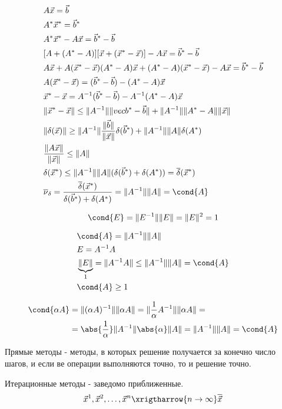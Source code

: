 \begin{align*}
  &A\vec{x} = \vec{b} \\
  &A^*\vec{x}^* = \vec{b}^*\\
  &A^*\vec{x}^* - A\vec{x} = \vec{b}^* - \vec{b} \\
  &[A + (A^* - A)][\vec{x} + (\vec{x}^* - \vec{x})] - A\vec{x} =\vec{b}^* - \vec{b} \\
  &A \vec{x} + A (\vec{x}^* - \vec{x}) (A^* - A)\vec{x} + (A^* - A)(\vec{x}^* - \vec{x}) - A\vec{x} = \vec{b}^* - \vec{b} \\
  &A(\vec{x}^* - \vec{x}) = (\vec{b}^* - \vec{b}) - (A^* - A)\vec{x} \\
  &\vec{x}^* - \vec{x} = A^{-1}(\vec{b}^* - \vec{b}) - A^{-1}(A^* - A)\vec{x} \\
  &\|\vec{x}^* - \vec{x}\| \leq \|A^{-1}\| \|vec{b}^* - \vec{b}\| + \|A^{-1}\| \|A^* - A\|\|\vec{x}\| \\
  &\|\delta(\vec{x})\| \geq \|A^{-1}\| \frac{\|\vec{b}\|}{\|\vec{x}\|} \delta(\vec{b}^*) +\|A^{-1}\| \|A\| \delta(A^*) \\
  &\frac{\|A\vec{x}\|}{\|\vec{x}\|} \leq \|A\| \\
  &\delta(\vec{x}^*) \leq \|A^{-1}\| \|A\| (\delta(\vec{b}^*) + \delta(A^*)) = \overline{\delta}(\vec{x}^*) \\
  &\overline{\nu}_\delta = \frac{\overline{\delta}(\vec{x}^*)}{\delta(\vec{b}^*) + \delta(A^*)} = \|A^{-1}\| \|A\| = \cond{A}
\end{align*}

\begin{note}
  \[
    \cond{E} = \|E^{-1}\| \|E\| = \|E\|^2 = 1
  \]
\end{note}

\begin{note}
  \begin{align*}
    &\cond{A} = \|A^{-1}\| \|A\| \\
    &E = A^{-1} A\\
    &\underbrace{\|E\|}_1 = \|A^{-1} A\| \leq \|A^{-1}\| \|A\| = \cond{A} \\
    &\cond{A} \geq 1
  \end{align*}
\end{note}

\begin{note}
  \begin{align*}
    \cond{\alpha A} &= \|(\alpha A)^{-1}\| \|\alpha A\| = \|\frac 1\alpha A^{-1}\| \|\alpha A\| = \\
                    &=\abs{\frac 1\alpha} \|A^{-1}\| \abs{\alpha} \|A\| = \|A^{-1}\| \|A\| = \cond{A}
  \end{align*}
\end{note}

\begin{defn}
  Прямые методы - методы, в которых решение получается за конечно число шагов,
  и если ве операции выполняются точно, то и решение точно.
\end{defn}

\begin{defn}
  Итерационные методы - заведомо приближенные.
  \[
    \vec{x}^1, \vec{x}^2, \dotsc, \vec{x}^n \xrigtharrow{n \to \infty} \overline{\vec{x}}
  \]
\end{defn}


